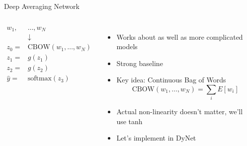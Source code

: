 \documentclass[compress]{beamer}
\begin{document}
\begin{frame}[fragile]{Deep Averaging Network}

\begin{columns}

  \begin{align*}
    w_1, &\dots, w_N \\
    & \downarrow \\
    z_0 = & \mbox{CBOW}(w_1, \dots, w_N) \\
    z_1 = & g(z_1) \\
    z_2 = & g(z_2) \\
    \hat y = & \mbox{softmax}(z_3)
  \end{align*}


    \begin{itemize}
      \item Works about as well as more complicated models
      \item Strong baseline
      \item Key idea: Continuous Bag of Words
        \begin{equation}
          \mbox{CBOW}(w_1, \dots, w_N) = \sum_i E[w_i]
        \end{equation}
      \item Actual non-linearity doesn't matter, we'll use tanh
      \item Let's implement in DyNet
    \end{itemize}

\end{columns}
\end{frame}
\end{document}
